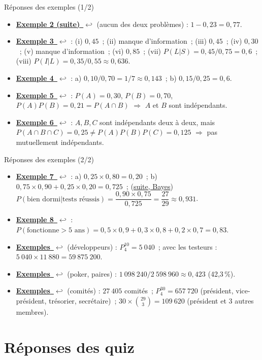 \documentclass{BeamerTemplate}
\newcommand{\retour}[2]{\hyperlink{#1}{\textbf{#2}~{\color{gray}$\hookleftarrow$}}}
\begin{document}
\begin{frame}[t,label=rep-ex1]{Réponses des exemples (1/2)}
\footnotesize
\begin{itemize}
\item \retour{ex2s}{Exemple 2 (suite)} (aucun des deux problèmes) : $1-0{,}23=0{,}77$.
\item \retour{ex3}{Exemple 3} : (i) $0{,}45$~; (ii) manque d'information~; (iii) $0{,}45$~;
(iv) $0{,}30$~; (v) manque d'information~; (vi) $0{,}85$~; (vii) $P(L|S)=0{,}45/0{,}75=0{,}6$~;
(viii) $P(I|L)=0{,}35/0{,}55\approx0{,}636$.
\item \retour{ex4}{Exemple 4} : a) $0{,}10/0{,}70=1/7\approx0{,}143$~; b) $0{,}15/0{,}25=0{,}6$.
\item \retour{ex5}{Exemple 5} : $P(A)=0{,}30$, $P(B)=0{,}70$, $P(A)P(B)=0{,}21=P(A\cap B)$
$\Rightarrow$ $A$ et $B$ sont indépendants.
\item \retour{ex6}{Exemple 6} : $A,B,C$ sont indépendants deux à deux, mais
$P(A\cap B\cap C)=0{,}25\neq P(A)P(B)P(C)=0{,}125$ $\Rightarrow$ pas mutuellement
indépendants.
\end{itemize}
\end{frame}

\begin{frame}[t,label=rep-ex2]{Réponses des exemples (2/2)}
\footnotesize
\begin{itemize}
\item \retour{ex7}{Exemple 7} : a) $0{,}25\times0{,}80=0{,}20$~; b) $0{,}75\times0{,}90+0{,}25\times0{,}20=0{,}725$~;
(\hyperlink{ex7b}{suite, Bayes}) $P(\text{bien dormi}|\text{tests réussis})=\dfrac{0{,}90\times0{,}75}{0{,}725}=\dfrac{27}{29}\approx0{,}931$.
\item \retour{ex8}{Exemple 8} : $P(\text{fonctionne}>5\text{ ans})=0{,}5\times0{,}9+0{,}3\times0{,}8+0{,}2\times0{,}7=0{,}83$.
\item \retour{exdev}{Exemples} (développeurs) : $P^{10}_4=5~040$~; avec les testeurs : $5~040\times11~880=59~875~200$.
\item \retour{expoker}{Exemples} (poker, paires) : $1~098~240/2~598~960\approx0{,}423$ (42,3\,\%).
\item \retour{excomites}{Exemples} (comités) : $27~405$ comités~; $P^{30}_4=657~720$ (président, vice-président, trésorier,
secrétaire)~; $30\times{29\choose3}=109~620$ (président et 3 autres membres).
\end{itemize}
\end{frame}

\section{Réponses des quiz}
\end{document}
